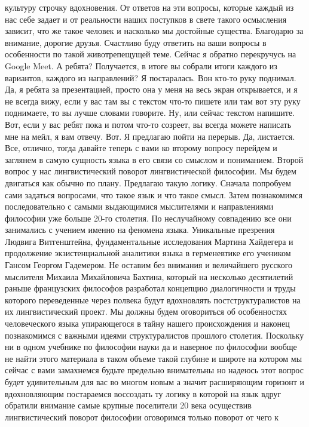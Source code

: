 культуру строчку вдохновения. От ответов на эти вопросы, которые каждый из нас
себе задает и от реальности наших поступков в свете такого осмысления зависит,
что же такое человек и насколько мы достойные существа. Благодарю за внимание,
дорогие друзья. Счастливо буду ответить на ваши вопросы в особенности по такой
животрепещущей теме. Сейчас я обратно перекручусь на Google Meet. А ребята?
Получается, в итоге вы собрали итоги каждого из вариантов, каждого из
направлений? Я постаралась. Вон кто-то руку поднимал. Да, я ребята за
презентацией, просто она у меня на весь экран открывается, и я не всегда вижу,
если у вас там вы с текстом что-то пишете или там вот эту руку поднимаете, то вы
лучше словами говорите. Ну, или сейчас текстом напишите. Вот, если у вас ребят
пока и потом что-то созреет, вы всегда можете написать мне на мейл, я вам
отвечу. Вот. Я предлагаю пойти на перерыв. Да, листается. Все, отлично, тогда
давайте теперь с вами ко второму вопросу перейдем и заглянем в самую сущность
языка в его связи со смыслом и пониманием. Второй вопрос у нас лингвистический
поворот лингвистической философии. Мы будем двигаться как обычно по плану.
Предлагаю такую логику. Сначала попробуем сами задаться вопросами, что такое
язык и что такое смысл. Затем познакомимся последовательно с самыми выдающимися
мыслителями и направлениями философии уже больше 20-го столетия. По неслучайному
совпадению все они занимались с учением именно на феномена языка. Уникальные
презрения Людвига Витгенштейна, фундаментальные исследования Мартина Хайдегера и
продолжение экзистенциальной аналитики языка в герменевтике его учеником Гансом
Георгом Гадемером. Не оставим без внимания и величайшего русского мыслителя
Михаила Михайловича Бахтина, который на несколько десятилетий раньше французских
философов разработал концепцию диалогичности и труды которого переведенные через
полвека будут вдохновлять постструктуралистов на их лингвистический проект. Мы
должны будем оговориться об особенностях человеческого языка упирающегося в
тайну нашего происхождения и наконец познакомимся с важными идеями
структуралистов прошлого столетия. Поскольку ни в одном учебнике по философии
науки да и наверное по философии вообще не найти этого материала в таком объеме
такой глубине и широте на котором мы сейчас с вами замахнемся будьте предельно
внимательны но надеюсь этот вопрос будет удивительным для вас во многом новым а
значит расширяющим горизонт и вдохновляющим постараемся воссоздать ту логику в
которой на язык вдруг обратили внимание самые крупные поселители 20 века
осуществив лингвистический поворот философии оговоримся только поворот от чего к
